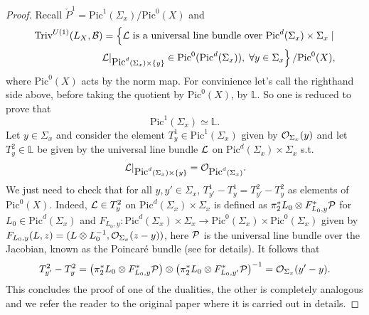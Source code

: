 \begin{proof}
Recall $\check{P}^1 = \mbox{Pic}^1(\Sigma_x)/\mbox{Pic}^0(X)$ and
\begin{align*}
\mbox{Triv}^{U(1)}(L_X,\mathcal{B}) = \left\{\mathcal{L}\mbox{ is a universal line
    bundle over }\mbox{Pic}^d(\Sigma_x)\times\Sigma_x \; | \right. \\
\left. \left.\mathcal{L}\right|_{\mbox{Pic}^d(\Sigma_x)\times\{y\}}\in\mbox{Pic}^0(\mbox{Pic}^d(\Sigma_x)),
  \; \forall y \in \Sigma_x\right\}/\mbox{Pic}^0(X),
\end{align*}
where $\mbox{Pic}^0(X)$ acts by the norm map. For convinience let's call the
righthand side above, before taking the quotient by $\mbox{Pic}^0(X)$,
by $\mathbb{L}$. So one is reduced to prove that
\[\mbox{Pic}^1(\Sigma_x) \simeq \mathbb{L}.\]
Let $y \in \Sigma_x$ and consider the element $T^1_y \in
\mbox{Pic}^1(\Sigma_x)$ given by $\mathcal{O}_{\Sigma_x}(y)$ and let $T^2_y \in
\mathbb{L}$ be given by the universal line bundle $\mathcal{L}$ on
$\mbox{Pic}^d(\Sigma_x)\times \Sigma_x$ s.t.
\[\left.\mathcal{L}\right|_{\mbox{Pic}^d(\Sigma_x)\times\{y\}}=\mathcal{O}_{\mbox{Pic}^d(\Sigma_x)}.\]
We just need to check that for all $y,y' \in \Sigma_x$, $T^1_{y'}-T^1_y
= T^2_{y'}-T^2_y$ as elements of $\mbox{Pic}^0(X)$. Indeed, $\mathcal{L} \in T^2_y$ on
$\mbox{Pic}^d(\Sigma_x)\times \Sigma_x$ is defined as
$\pi^*_2L_0\otimes F_{L_0,y}^*\mathcal{P}$ for $L_0 \in
\mbox{Pic}^d(\Sigma_x)$ and $F_{L_0,y}: \mbox{Pic}^d(\Sigma_x)\times
\Sigma_x \rightarrow \mbox{Pic}^0(\Sigma_x)\times \mbox{Pic}^0(\Sigma_x)$
given by $F_{L_0,y}(L,z) = (L\otimes L^{-1}_0,\mathcal{O}_{\Sigma_x}(z-y))$,
here $\mathcal{P}$ is the universal line bundle over the Jacobian, known as
the Poincar\'e bundle (see \cite[Chapter 16]{P} for details). It follows
that 
\[T^2_{y'}-T^2_y=\left(\pi^*_2L_0\otimes
  F^*_{L_0,y}\mathcal{P}\right)\otimes\left(\pi^*_2L_0\otimes
  F^*_{L_0,y'}\mathcal{P}\right)^{-1} = \mathcal{O}_{\Sigma_x}(y'-y).\]
This concludes the proof of one of the dualities, the other is
completely analogous and we refer the reader to the original paper
\cite{HT} where it is carried out in details.
\end{proof}

